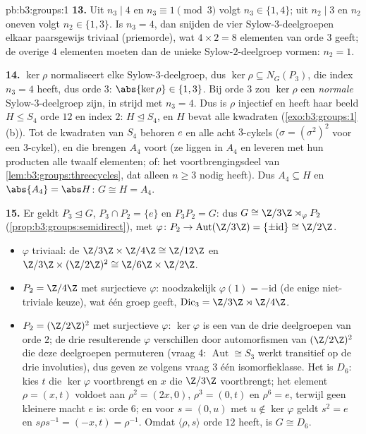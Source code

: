 \begin{solution}{pb:b3:groups:1}
\textbf{13.} Uit $n_3 \mid 4$ en $n_3 \equiv 1 \pmod 3$ volgt $n_3
\in \{1, 4\}$; uit $n_2 \mid 3$ en $n_2$ oneven volgt $n_2 \in \{1,
3\}$. Is $n_3 = 4$, dan snijden de vier Sylow-$3$-deelgroepen
elkaar paarsgewijs triviaal (priemorde), wat $4 \times 2 = 8$
elementen van orde $3$ geeft; de overige $4$ elementen moeten dan
de unieke Sylow-$2$-deelgroep vormen: $n_2 = 1$.

\textbf{14.} $\ker\rho$ normaliseert elke Sylow-$3$-deelgroep, dus
$\ker \rho \subseteq N_G(P_3)$, die index $n_3 = 4$ heeft, dus orde
$3$: $\abs{\ker\rho} \in \{1, 3\}$. Bij orde $3$ zou $\ker\rho$ een
\emph{normale} Sylow-$3$-deelgroep zijn, in strijd met $n_3 = 4$.
Dus is $\rho$ injectief en heeft haar beeld $H \leq S_4$ orde $12$
en index $2$: $H \trianglelefteq S_4$, en $H$ bevat alle kwadraten
(\cref{exo:b3:groups:1}(b)). Tot de kwadraten van $S_4$ behoren $e$
en alle acht $3$-cykels ($\sigma = (\sigma^2)^2$ voor een
$3$-cykel), en die brengen $A_4$ voort (ze liggen in $A_4$ en
leveren met hun producten alle twaalf elementen; of: het
voortbrengingsdeel van \cref{lem:b3:groups:threecycles}, dat alleen
$n \geq 3$ nodig heeft). Dus $A_4 \subseteq H$ en $\abs{A_4} = \abs
H$: $G \cong H = A_4$.

\textbf{15.} Er geldt $P_3 \trianglelefteq G$, $P_3 \cap P_2 =
\{e\}$ en $P_3P_2 = G$: dus $G \cong \Z/3\Z \rtimes_\varphi P_2$
(\cref{prop:b3:groups:semidirect}), met $\varphi \colon P_2 \to
\operatorname{Aut}(\Z/3\Z) = \{\pm\mathrm{id}\} \cong \Z/2\Z$.
\begin{itemize}
  \item $\varphi$ triviaal: de  $\Z/3\Z \times
        \Z/4\Z \cong \Z/12\Z$ en $\Z/3\Z \times (\Z/2\Z)^2 \cong
        \Z/6\Z \times \Z/2\Z$.
  \item $P_2 = \Z/4\Z$ met surjectieve $\varphi$: noodzakelijk
        $\varphi(1) = -\mathrm{id}$ (de enige niet-triviale keuze),
        wat één groep geeft, $\mathrm{Dic}_3 = \Z/3\Z \rtimes
        \Z/4\Z$.
  \item $P_2 = (\Z/2\Z)^2$ met surjectieve $\varphi$: $\ker\varphi$
        is een van de drie deelgroepen van orde $2$; de drie
        resulterende $\varphi$ verschillen door automorfismen van
        $(\Z/2\Z)^2$ die deze deelgroepen permuteren (vraag 4:
        $\operatorname{Aut} \cong S_3$ werkt transitief op de drie
        involuties), dus geven ze volgens vraag 3 één
        isomorfieklasse. Het is $D_6$: kies $t$ die $\ker\varphi$
        voortbrengt en $x$ die $\Z/3\Z$ voortbrengt; het element
        $\rho = (x, t)$ voldoet aan $\rho^2 = (2x, 0)$, $\rho^3 =
        (0, t)$ en $\rho^6 = e$, terwijl geen kleinere macht $e$ is:
        orde $6$; en voor $s = (0, u)$ met $u \notin \ker\varphi$
        geldt $s^2 = e$ en $s\rho s^{-1} = (-x, t) = \rho^{-1}$.
        Omdat $\langle \rho, s\rangle$ orde $12$ heeft, is $G \cong
        D_6$.
\end{itemize}


\end{solution}
